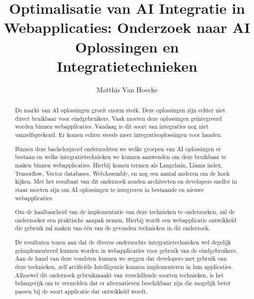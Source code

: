 \documentclass[dutch]{hogent-article}
\title{Optimalisatie van AI Integratie in Webapplicaties: Onderzoek naar AI Oplossingen en Integratietechnieken}
\author{Matthis Van Hoecke}
\begin{document}
\begin{abstract}
  
  De markt van AI oplossingen groeit enorm sterk. Deze oplossingen zijn echter niet direct
bruikbaar voor eindgebruikers. Vaak moeten deze oplossingen geïntegreerd worden binnen
webapplicaties. Vandaag is dit soort van integraties nog niet vanzelfsprekend. Er komen
echter steeds meer integratieoplossingen voor handen.
  
  \setlength{\parskip}{1em}
  
  Binnen deze bachelorproef onderzochten we welke groepen van AI oplossingen er
bestaan en welke integratietechnieken we kunnen aanwenden om deze bruikbaar te maken
binnen webapplicaties. Hierbij komen termen als Langchain, Llama index, Tensorflow, Vector
databases, WebAssembly, en nog een aantal anderen om de hoek kijken. Met het resultaat van dit onderzoek
zouden architecten en developers sneller in staat moeten zijn om AI oplossingen te
integreren in bestaande en nieuwe webapplicaties.
  
 Om de haalbaarheid van de implementatie van deze technieken te onderzoeken, zal de onderzoeker een praktische aanpak nemen. Hierbij wordt een webapplicatie ontwikkeld die gebruik zal maken van één van de gevonden technieken in dit onderzoek.
  
  De resultaten tonen aan dat de diverse onderzochte integratietechnieken wel degelijk geïmplementeerd kunnen worden in webapplicaties voor gebruik van de eindgebruikers. 
  Aan de hand van deze vondsten kunnen we zeggen dat developers met gebruik van deze technieken, zelf artificiële Intelligentie kunnen implementeren in hun applicaties. 
  Alhoewel dit onderzoek gebruikmaakt van verschillende soorten technieken, is het belangerijk om te vermelden dat er alternatieven beschikbaar zijn die mogelijk beter passen bij de soort applicatie dat ontwikkeld wordt.

\end{abstract}

\tableofcontents

\bigskip



\end{document}
